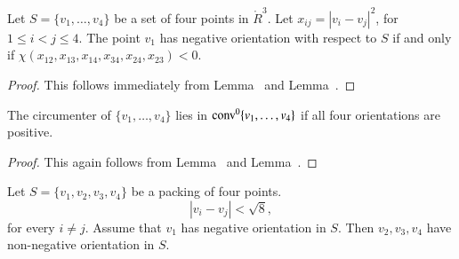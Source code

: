 \begin{tarskidata}
\begin{tarski}

\begin{lemma} 
Let $S=\{v_1,\ldots,v_4\}$ be a set of four points
in $\ring{R}^3$.  
Let $x_{ij}=|v_i-v_j|^2$, for $1\le i< j\le 4$.
The point $v_1$ has negative
orientation with respect to $S$ if and only if
    $\chi(x_{12},x_{13},x_{14},x_{34},x_{24},
    x_{23})<0$.
\end{lemma}

\begin{proof} 
This follows immediately from  Lemma~ and 
Lemma~.
\end{proof}
\end{tarski}



\begin{tarski}

\begin{lemma}
The circumenter of $\{v_1,\ldots,v_4\}$ lies in
${\operatorname{conv}}^0\{v_1,\ldots,v_4\}$ if all four
orientations are positive.
\end{lemma}

\begin{proof}  This again follows from
Lemma~ and 
Lemma~.
\end{proof}
\end{tarski}






\begin{tarski}

\begin{lemma} 
Let $S=\{v_1,v_2,v_3,v_4\}$ be a packing of four points.
   $$
   |v_i-v_j| < \sqrt8,
   $$
for every $i\ne j$.
Assume that $v_1$ has negative orientation in $S$.  Then
$v_2,v_3,v_4$ have non-negative orientation in $S$.
\end{lemma}



\end{tarski}
\end{tarskidata}
